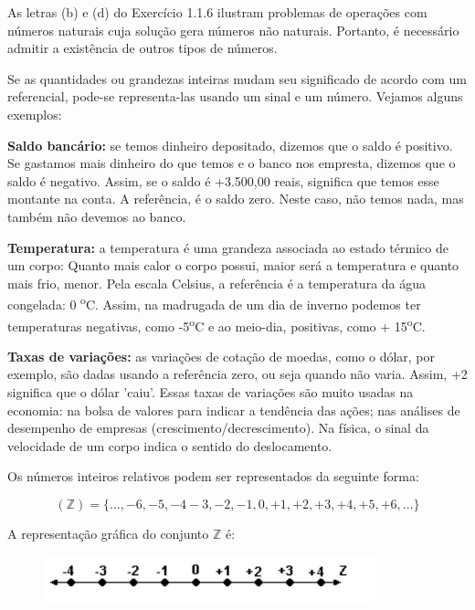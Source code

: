 As letras (b) e (d) do Exercício 1.1.6 ilustram problemas de operações com números naturais cuja solução gera números não naturais. Portanto, é necessário admitir a existência de outros tipos de números.

Se as quantidades ou grandezas inteiras mudam seu significado de acordo com um referencial, pode-se representa-las usando um sinal e um número. Vejamos alguns exemplos:

\textbf{Saldo bancário:} se temos dinheiro depositado, dizemos que o saldo é positivo. Se gastamos mais dinheiro do que temos e o banco nos empresta, dizemos que o saldo é negativo. Assim, se o saldo é +3.500,00 reais, significa que temos esse montante na conta. A referência, é o saldo zero. Neste caso, não temos nada, mas também não devemos ao banco.

\textbf{Temperatura:} a temperatura é uma grandeza associada ao estado térmico de um corpo: Quanto mais calor o corpo possui, maior será a temperatura e quanto mais frio, menor. Pela escala Celsius, a referência é a temperatura da água congelada: 0 \textsuperscript{o}C. Assim, na madrugada de um dia de inverno podemos ter temperaturas negativas, como -5\textsuperscript{o}C e ao meio-dia, positivas, como + 15\textsuperscript{o}C.

\textbf{Taxas de variações:} as variações de cotação de moedas, como o dólar, por exemplo, são dadas usando a referência zero, ou seja quando não varia. Assim, +2  significa que o dólar 'caiu'. Essas taxas de variações são muito usadas na economia: na bolsa de valores para indicar a tendência das ações; nas análises de desempenho de empresas (crescimento/decrescimento). Na física, o sinal da velocidade de um corpo indica o sentido do deslocamento.

Os números inteiros relativos podem ser representados da seguinte forma: 

 $$(\mathbb{Z})  = \{\dots,-6,-5,-4-3,-2,-1,0,+1,+2,+3,+4,+5,+6,\dots\}$$

A representação gráfica do conjunto  \(\mathbb{Z}\)  é:

\begin{figure}[H]
	\begin{Center}
		\includegraphics[width=3.77in,height=0.54in]{capitulos/conjuntos_numericos/media/image6.pdf}
	\end{Center}
\end{figure}

